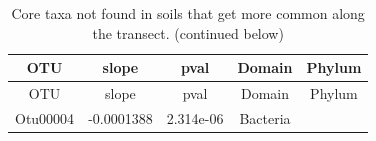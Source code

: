 \documentclass[]{article}
\begin{document}
\begin{longtable}[]{@{}ccccc@{}}
\caption{Core taxa not found in soils that get more common along the
transect. (continued below)}\tabularnewline
\toprule
\begin{minipage}[b]{0.13\columnwidth}\centering\strut
OTU\strut
\end{minipage} & \begin{minipage}[b]{0.16\columnwidth}\centering\strut
slope\strut
\end{minipage} & \begin{minipage}[b]{0.14\columnwidth}\centering\strut
pval\strut
\end{minipage} & \begin{minipage}[b]{0.13\columnwidth}\centering\strut
Domain\strut
\end{minipage} & \begin{minipage}[b]{0.27\columnwidth}\centering\strut
Phylum\strut
\end{minipage}\tabularnewline
\midrule
\endfirsthead
\toprule
\begin{minipage}[b]{0.13\columnwidth}\centering\strut
OTU\strut
\end{minipage} & \begin{minipage}[b]{0.16\columnwidth}\centering\strut
slope\strut
\end{minipage} & \begin{minipage}[b]{0.14\columnwidth}\centering\strut
pval\strut
\end{minipage} & \begin{minipage}[b]{0.13\columnwidth}\centering\strut
Domain\strut
\end{minipage} & \begin{minipage}[b]{0.27\columnwidth}\centering\strut
Phylum\strut
\end{minipage}\tabularnewline
\midrule
\endhead
\begin{minipage}[t]{0.13\columnwidth}\centering\strut
Otu00004\strut
\end{minipage} & \begin{minipage}[t]{0.16\columnwidth}\centering\strut
-0.0001388\strut
\end{minipage} & \begin{minipage}[t]{0.14\columnwidth}\centering\strut
2.314e-06\strut
\end{minipage} & \begin{minipage}[t]{0.13\columnwidth}\centering\strut
Bacteria\strut
\end{minipage} & \begin{minipage}[t]{0.27\columnwidth}\centering\strut

\end{minipage}
\end{longtable}
\end{document}
